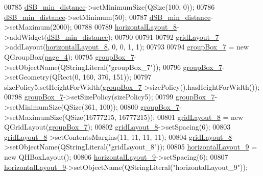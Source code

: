 \begin{DoxyCode}
00785         \hyperlink{a00027_a01c23085590f4947828948bbd9f50cc7}{dSB\_min\_distance}->setMinimumSize(QSize(100, 0));
00786         \hyperlink{a00027_a01c23085590f4947828948bbd9f50cc7}{dSB\_min\_distance}->setMinimum(50);
00787         \hyperlink{a00027_a01c23085590f4947828948bbd9f50cc7}{dSB\_min\_distance}->setMaximum(2000);
00788 
00789         \hyperlink{a00027_a8ead8fc876ee91c30864822eedb9c370}{horizontalLayout\_8}->addWidget(\hyperlink{a00027_a01c23085590f4947828948bbd9f50cc7}{dSB\_min\_distance});
00790 
00791 
00792         \hyperlink{a00027_a4c2d544352d423a361b8ab2e1d5636ec}{gridLayout\_7}->addLayout(\hyperlink{a00027_a8ead8fc876ee91c30864822eedb9c370}{horizontalLayout\_8}, 0, 0, 1, 1);
00793 
00794         \hyperlink{a00027_a269faaef68e4ad4784635810fcae5698}{groupBox\_7} = \textcolor{keyword}{new} QGroupBox(\hyperlink{a00027_ad52b1b3da7f1a695b9d3b521254c961d}{page\_4});
00795         \hyperlink{a00027_a269faaef68e4ad4784635810fcae5698}{groupBox\_7}->setObjectName(QStringLiteral(\textcolor{stringliteral}{"groupBox\_7"}));
00796         \hyperlink{a00027_a269faaef68e4ad4784635810fcae5698}{groupBox\_7}->setGeometry(QRect(0, 160, 376, 151));
00797         sizePolicy5.setHeightForWidth(\hyperlink{a00027_a269faaef68e4ad4784635810fcae5698}{groupBox\_7}->sizePolicy().hasHeightForWidth());
00798         \hyperlink{a00027_a269faaef68e4ad4784635810fcae5698}{groupBox\_7}->setSizePolicy(sizePolicy5);
00799         \hyperlink{a00027_a269faaef68e4ad4784635810fcae5698}{groupBox\_7}->setMinimumSize(QSize(361, 100));
00800         \hyperlink{a00027_a269faaef68e4ad4784635810fcae5698}{groupBox\_7}->setMaximumSize(QSize(16777215, 16777215));
00801         \hyperlink{a00027_a20728ed83bf740332bd908ea3e15ace6}{gridLayout\_8} = \textcolor{keyword}{new} QGridLayout(\hyperlink{a00027_a269faaef68e4ad4784635810fcae5698}{groupBox\_7});
00802         \hyperlink{a00027_a20728ed83bf740332bd908ea3e15ace6}{gridLayout\_8}->setSpacing(6);
00803         \hyperlink{a00027_a20728ed83bf740332bd908ea3e15ace6}{gridLayout\_8}->setContentsMargins(11, 11, 11, 11);
00804         \hyperlink{a00027_a20728ed83bf740332bd908ea3e15ace6}{gridLayout\_8}->setObjectName(QStringLiteral(\textcolor{stringliteral}{"gridLayout\_8"}));
00805         \hyperlink{a00027_ab48e49d68609b4c66e5169e2f87e3eb9}{horizontalLayout\_9} = \textcolor{keyword}{new} QHBoxLayout();
00806         \hyperlink{a00027_ab48e49d68609b4c66e5169e2f87e3eb9}{horizontalLayout\_9}->setSpacing(6);
00807         \hyperlink{a00027_ab48e49d68609b4c66e5169e2f87e3eb9}{horizontalLayout\_9}->setObjectName(QStringLiteral(\textcolor{stringliteral}{"horizontalLayout\_9"}));

\end{DoxyCode}
